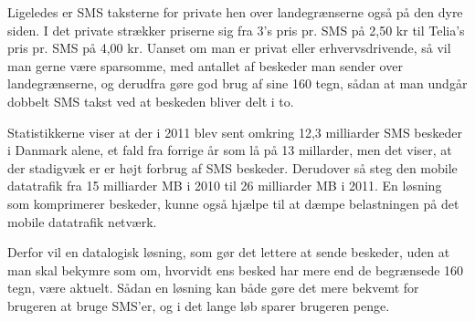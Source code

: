 Ligeledes er SMS taksterne for private hen over landegrænserne også på den dyre siden. I det private strækker priserne sig fra 3's pris pr. SMS på 2,50 kr\cite{Pro_4} til Telia's pris pr. SMS på 4,00 kr\cite{Pro_5}. Uanset om man er privat eller erhvervsdrivende, så vil man gerne være sparsomme, med antallet af beskeder man sender over landegrænserne, og derudfra gøre god brug af sine 160 tegn, sådan at man undgår dobbelt SMS takst ved at beskeden bliver delt i to.

Statistikkerne viser at der i 2011 blev sent omkring 12,3 milliarder SMS beskeder i Danmark alene, et fald fra forrige år som lå på 13 millarder, men det viser, at der stadigvæk er er højt forbrug af SMS beskeder. Derudover så steg den mobile datatrafik fra 15 milliarder MB i 2010 til 26 milliarder MB i 2011\cite{Pro_6}. En løsning som komprimerer beskeder, kunne også hjælpe til at dæmpe belastningen på det mobile datatrafik netværk.

Derfor vil en  datalogisk løsning, som gør det lettere at sende beskeder, uden at man skal bekymre som om, hvorvidt ens besked har mere end de begrænsede 160 tegn, være aktuelt. Sådan en løsning kan både gøre det mere bekvemt for brugeren at bruge SMS'er, og i det lange løb sparer brugeren penge.